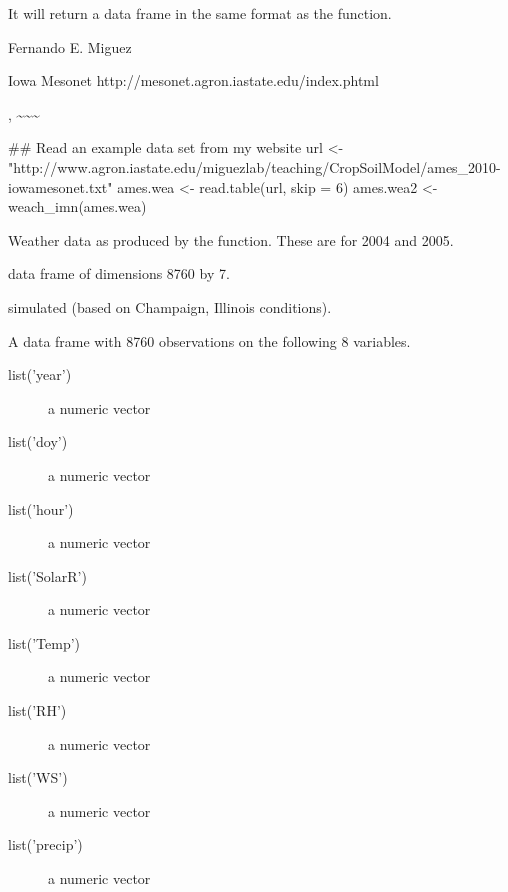 \documentclass[letterpaper]{book}
\begin{document}
%
\begin{Value}
It will return a data frame in the same format as the
 function.
\end{Value}
%
\begin{Author}\relax
Fernando E. Miguez
\end{Author}
%
\begin{References}\relax
Iowa Mesonet http://mesonet.agron.iastate.edu/index.phtml

\end{References}
%
\begin{SeeAlso}\relax
{} 
, \textasciitilde{}\textasciitilde{}\textasciitilde{}
\end{SeeAlso}
%
\begin{Examples}
\begin{ExampleCode}
## Read an example data set from my website
url <- "http://www.agron.iastate.edu/miguezlab/teaching/CropSoilModel/ames_2010-iowamesonet.txt"
ames.wea <- read.table(url, skip = 6)
ames.wea2 <- weach_imn(ames.wea)
\end{ExampleCode}
\end{Examples}
%
\begin{Description}\relax
Weather data as produced by the 
function.  These are for 2004 and 2005.
\end{Description}
%
\begin{Format}
data frame of dimensions 8760 by 7.
\end{Format}
%
\begin{Source}\relax
simulated (based on Champaign, Illinois conditions).
\end{Source}
%
\begin{Format}
A data frame with 8760 observations on the following 8 variables.
\begin{description}
 \item[list('year')] a numeric vector\item[list('doy')] a
numeric vector\item[list('hour')] a numeric vector
\item[list('SolarR')] a numeric vector\item[list('Temp')] a numeric
vector\item[list('RH')] a numeric vector\item[list('WS')] a numeric
vector\item[list('precip')] a numeric vector
\end{description}
\end{Format}
\end{document}
